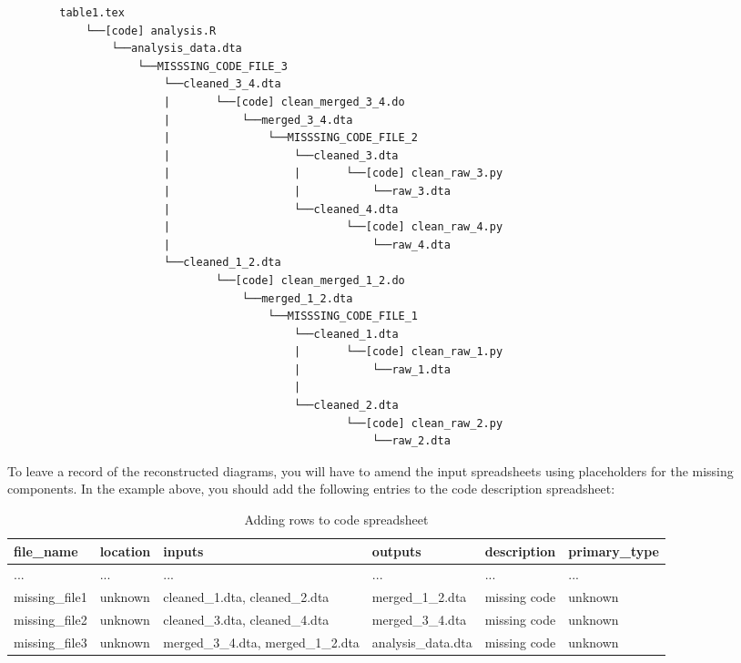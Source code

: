 \documentclass[
  openany]{book}
\begin{document}
\begin{verbatim}
        table1.tex
            └──[code] analysis.R
                └──analysis_data.dta
                    └──MISSSING_CODE_FILE_3
                        └──cleaned_3_4.dta
                        |       └──[code] clean_merged_3_4.do
                        |           └──merged_3_4.dta
                        |               └──MISSSING_CODE_FILE_2
                        |                   └──cleaned_3.dta
                        |                   |       └──[code] clean_raw_3.py
                        |                   |           └──raw_3.dta    
                        |                   └──cleaned_4.dta
                        |                           └──[code] clean_raw_4.py
                        |                               └──raw_4.dta
                        └──cleaned_1_2.dta
                                └──[code] clean_merged_1_2.do
                                    └──merged_1_2.dta
                                        └──MISSSING_CODE_FILE_1
                                            └──cleaned_1.dta
                                            |       └──[code] clean_raw_1.py
                                            |           └──raw_1.dta
                                            |   
                                            └──cleaned_2.dta
                                                    └──[code] clean_raw_2.py
                                                        └──raw_2.dta
\end{verbatim}

To leave a record of the reconstructed diagrams, you will have to amend the input spreadsheets using placeholders for the missing components. In the example above, you should add the following entries to the code description spreadsheet:

\begin{table}[!h]

\caption{\label{tab:adding-rows-extra}Adding rows to code spreadsheet}
\centering
\begin{tabu} to 
\hline
file\_name & location & inputs & outputs & description & primary\_type\\
\hline
... & ... & ... & ... & ... & ...\\
\hline
missing\_file1 & unknown & cleaned\_1.dta, cleaned\_2.dta & merged\_1\_2.dta & missing code & unknown\\
\hline
missing\_file2 & unknown & cleaned\_3.dta, cleaned\_4.dta & merged\_3\_4.dta & missing code & unknown\\
\hline
missing\_file3 & unknown & merged\_3\_4.dta, merged\_1\_2.dta & analysis\_data.dta & missing code & unknown\\
\hline
\end{tabu}
\end{table}
\end{document}
